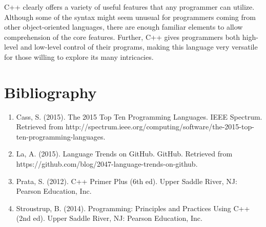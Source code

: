 \documentclass[11pt]{article}
\begin{document}
	C++ clearly offers a variety of useful features that any programmer can utilize.  Although some of the syntax might seem unusual for programmers coming from other object-oriented languages, there are enough familiar elements to allow comprehension of the core features.  Further, C++ gives programmers both high-level and low-level control of their programs, making this language very versatile for those willing to explore its many intricacies.  

\newpage
\section{Bibliography}
\begin{enumerate}
	\item Cass, S.  (2015).  The 2015 Top Ten Programming Languages.  IEEE Spectrum.  Retrieved from http://spectrum.ieee.org/computing/software/the-2015-top-ten-programming-languages.
	\item La, A.  (2015).  Language Trends on GitHub.  GitHub.  Retrieved from https://github.com/blog/2047-language-trends-on-github.
	\item Prata, S.  (2012).  C++ Primer Plus (6th ed).  Upper Saddle River, NJ: Pearson Education, Inc.
	\item Stroustrup, B.  (2014).  Programming: Principles and Practices Using C++ (2nd ed).  Upper Saddle River, NJ: Pearson Education, Inc.
\end{enumerate}
\end{document}
